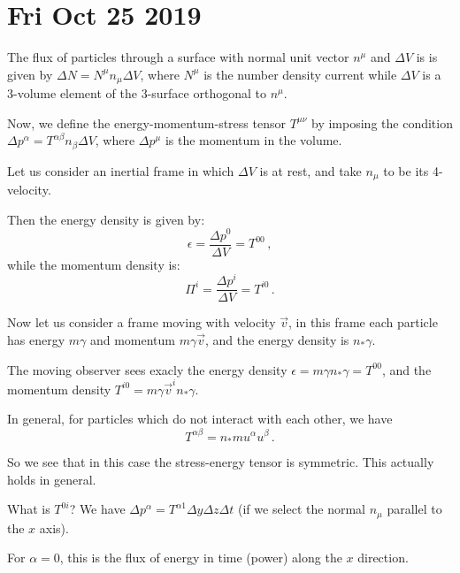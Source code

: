 \documentclass[main.tex]{subfiles}
\begin{document}
\section*{Fri Oct 25 2019}

The flux of particles through a surface with normal unit vector \(n^{\mu }\) and \(\Delta V\) is  is given  by \(\Delta N = N^{\mu }n_{\mu } \Delta V\), where \(N^{\mu }\) is the number  density current while \(\Delta V\) is a 3-volume element of the 3-surface orthogonal to \(n^{\mu }\).

Now, we define the energy-momentum-stress tensor \(T^{\mu \nu }\)  by imposing the condition \(\Delta p^{\alpha } = T^{\alpha \beta }n_{\beta }\Delta V\), where \(\Delta p^{\mu}\) is the momentum in the volume.

Let us consider an inertial frame in which \(\Delta V\) is at rest, and take \(n_{\mu }\) to be its 4-velocity.

Then the energy density is given by: 
%
\begin{equation}
  \epsilon  = \frac{\Delta p^{0}}{\Delta V} = T^{00}
\,,
\end{equation}
%
while the momentum density is: 
%
\begin{equation}
  \Pi^{i} = \frac{\Delta p^{i}}{\Delta V} = T^{i0}
\,.
\end{equation}

Now let us consider a frame moving with velocity \(\vec{v}  \), in this frame each particle has energy \(m \gamma \) and momentum \(m \gamma \vec{v}\), and the energy density is \(n_{*} \gamma \).

The moving observer sees exacly the energy density \(\epsilon = m \gamma n_{*} \gamma  = T^{00}\), and the momentum density \(T^{i0} = m \gamma \vec{v}^{i} n_{*}\gamma \).

In general, for particles which do not interact with each other, we have 
%
\begin{equation}
  T^{\alpha \beta } = n_{*} m u^{\alpha }u^{\beta }
\,.
\end{equation}

So we see that in this case the stress-energy tensor is symmetric. This actually holds in general.

What is \(T^{0i}\)? We have \(\Delta p^{\alpha } = T^{\alpha 1} \Delta y \Delta z \Delta t\) (if we select the normal \(n_{\mu }\) parallel to the \(x\) axis).

For \(\alpha = 0\), this is the flux of energy in time (power) along the \(x\) direction.
\end{document}
